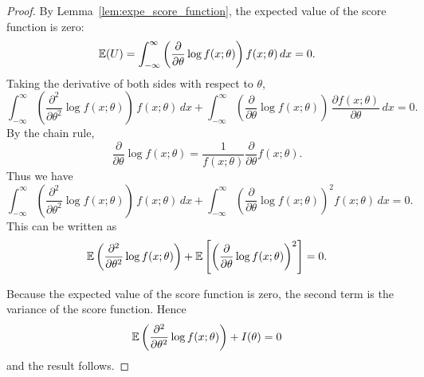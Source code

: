 \begin{proof}
By Lemma~\ref{lem:expe_score_function}, the expected value of the score function is zero:
\[
\mathbb{E}(U) = \int_{-\infty}^{\infty} \left(\frac{\partial}{\partial\theta}\log f(x;\theta)\right) f(x;\theta) \,dx = 0.
\]
Taking the derivative of both sides with respect to $\theta$,
\[
\int_{-\infty}^{\infty} \left(\frac{\partial^2}{\partial\theta^2}\log f(x;\theta)\right)\,f(x;\theta) \,dx 
+
\int_{-\infty}^{\infty} \left(\frac{\partial}{\partial\theta}\log f(x;\theta)\right)\,\frac{\partial f(x;\theta)}{\partial\theta} \,dx 
= 0.
\]
By the chain rule, 
\[
\frac{\partial}{\partial\theta}\log f(x;\theta)  = \frac{1}{f(x;\theta)}\frac{\partial}{\partial\theta}f(x;\theta).
\]
Thus we have
\[
\int_{-\infty}^{\infty} \left(\frac{\partial^2}{\partial\theta^2}\log f(x;\theta)\right)\,f(x;\theta) \,dx 
+
\int_{-\infty}^{\infty} \left(\frac{\partial}{\partial\theta}\log f(x;\theta)\right)^2 f(x;\theta)\,dx 
= 0.
\]
This can be written as
\[
\mathbb{E}\left(\frac{\partial^2}{\partial\theta^2}\log f(x;\theta)\right)
+
\mathbb{E}\left[\left(\frac{\partial}{\partial\theta}\log f(x;\theta)\right)^2 \right]
= 0.
\]

Because the expected value of the score function is zero, the second term is the variance of the score function. Hence
\[
\mathbb{E}\left(\frac{\partial^2}{\partial\theta^2}\log f(x;\theta)\right)
+
I(\theta) = 0
\]
and the result follows.
%
\end{proof}

